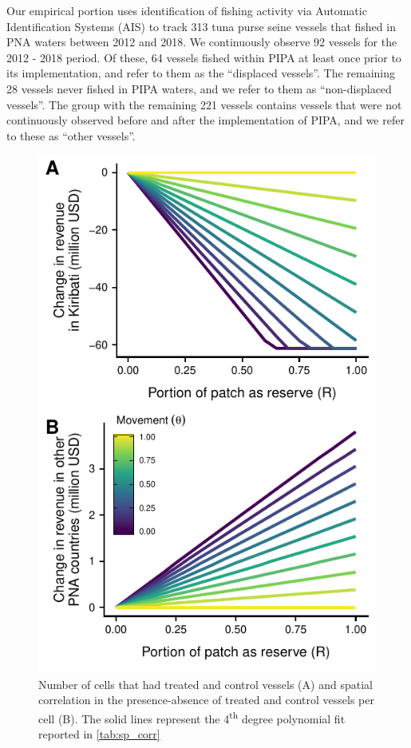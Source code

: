 \documentclass[9p,twocolumn,twoside,lineno]{pnas-new}
\begin{document}
Our empirical portion uses identification of fishing activity via Automatic Identification Systems (AIS) to track 313 tuna purse seine vessels that fished in PNA waters between 2012 and 2018. We continuously observe 92 vessels for the 2012 - 2018 period. Of these, 64 vessels fished within PIPA at least once prior to its implementation, and refer to them as the ``displaced vessels''. The remaining 28 vessels never fished in PIPA waters, and we refer to them as ``non-displaced vessels''. The group with the remaining 221 vessels contains vessels that were not continuously observed before and after the implementation of PIPA, and we refer to these as ``other vessels''.

\begin{figure}[htbp]
\centering
\includegraphics{img/PNA_model.pdf}
\caption{\label{fig:PNA_model}Number of cells that had treated and control vessels (A) and spatial correlation in the presence-absence of treated and control vessels per cell (B). The solid lines represent the 4\textsuperscript{th} degree polynomial fit reported in \ref{tab:sp_corr}}
\end{figure}
\end{document}
